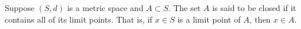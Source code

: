 Suppose $(S, d)$ is a metric space and $A \subset S$. The set $A$ is said to be closed if it contains all of its limit points. That is, if $x \in S$ is a limit point of $A$, then $x \in A$.
